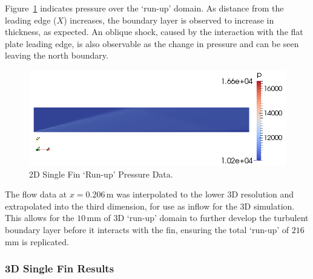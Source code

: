 Figure~\ref{f:tc2:runupmach} indicates pressure over the `run-up' domain. As distance from the leading edge ($X$) increases, the boundary layer is observed to increase in thickness, as expected. An oblique shock, caused by the interaction with the flat plate leading edge, is also observable as the change in pressure and can be seen leaving the north boundary.
%
\begin{figure}[htbp]
 \begin{center}
  \includegraphics[width=14cm]{./chap7-3Dsinglefin/figs/tc2-runup-mach.png}
  \caption{2D Single Fin `Run-up' Pressure Data.}
  \label{f:tc2:runupmach}
 \end{center}
\end{figure}
%

The flow data at $x=0.206$\,m was interpolated to the lower 3D resolution and extrapolated into the third dimension, for use as inflow for the 3D simulation. This allows for the $10$\,mm of 3D `run-up' domain to further develop the turbulent boundary layer before it interacts with the fin, ensuring the total `run-up' of $216$\,mm is replicated.

\subsubsection{3D Single Fin Results}

